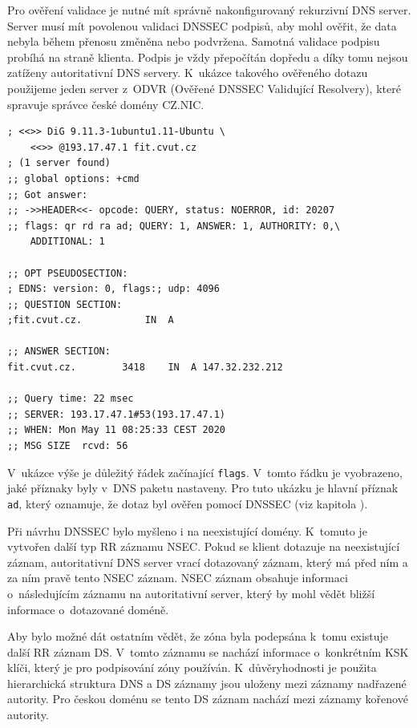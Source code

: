 \documentclass[thesis=M,czech]{src/FITthesis}[2019/12/23]
\begin{document}
Pro ověření validace je nutné mít správně nakonfigurovaný rekurzivní DNS server. Server musí mít povolenou validaci DNSSEC podpisů, aby mohl ověřit, že data nebyla během přenosu  změněna nebo podvržena. Samotná validace podpisu probíhá na straně klienta. Podpis je vždy přepočítán dopředu a díky tomu nejsou zatíženy autoritativní DNS servery. K~ukázce takového ověřeného dotazu použijeme jeden server z~ODVR (Ověřené DNSSEC Validující Resolvery), které spravuje správce české domény CZ.NIC. 

\begin{verbatim}
; <<>> DiG 9.11.3-1ubuntu1.11-Ubuntu \
    <<>> @193.17.47.1 fit.cvut.cz
; (1 server found)
;; global options: +cmd
;; Got answer:
;; ->>HEADER<<- opcode: QUERY, status: NOERROR, id: 20207
;; flags: qr rd ra ad; QUERY: 1, ANSWER: 1, AUTHORITY: 0,\
    ADDITIONAL: 1

;; OPT PSEUDOSECTION:
; EDNS: version: 0, flags:; udp: 4096
;; QUESTION SECTION:
;fit.cvut.cz.			IN	A

;; ANSWER SECTION:
fit.cvut.cz.		3418	IN	A 147.32.232.212

;; Query time: 22 msec
;; SERVER: 193.17.47.1#53(193.17.47.1)
;; WHEN: Mon May 11 08:25:33 CEST 2020
;; MSG SIZE  rcvd: 56
\end{verbatim}

V~ukázce výše je důležitý řádek začínající \texttt{flags}. V~tomto řádku je vyobrazeno, jaké příznaky byly v~DNS paketu nastaveny. Pro tuto ukázku je hlavní příznak \texttt{ad}, který oznamuje, že dotaz byl ověřen pomocí DNSSEC (viz kapitola \textit{}). 

Při návrhu DNSSEC bylo myšleno i na neexistující domény. K~tomuto je vytvořen další typ RR záznamu NSEC. Pokud se klient dotazuje na neexistující záznam, autoritativní DNS server vrací dotazovaný záznam, který má před ním a za ním pravě tento NSEC záznam. NSEC záznam obsahuje informaci o~následujícím záznamu na autoritativní server, který by mohl vědět bližší informace o~dotazované doméně. 

Aby bylo možné dát ostatním vědět, že zóna byla podepsána k~tomu existuje další RR záznam DS. V~tomto záznamu se nachází informace o~konkrétním KSK klíči, který je pro podpisování zóny používán. K~důvěryhodnosti je použita hierarchická struktura DNS a DS záznamy jsou uloženy mezi záznamy nadřazené autority. Pro českou doménu se tento DS záznam nachází mezi záznamy kořenové autority. \cite{root-dnssec-about, root-dnssec-detail, cznic-odvr, RFC4033, RFC4034}
\end{document}
